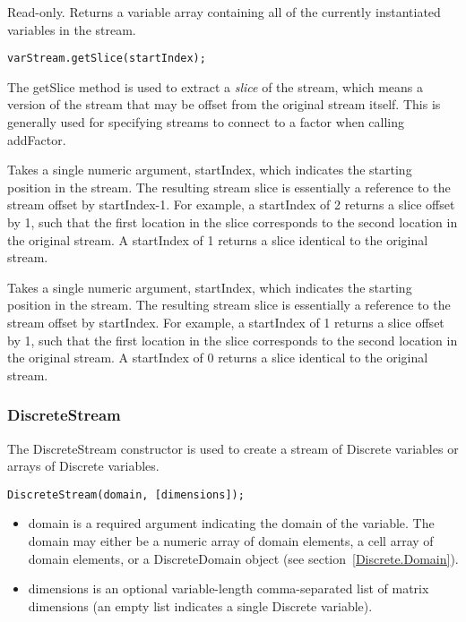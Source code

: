 
Read-only.  Returns a variable array containing all of the currently instantiated variables in the stream.



\label{sec:VariableStream.getSlice}

\begin{lstlisting}
varStream.getSlice(startIndex);
\end{lstlisting}

The getSlice method is used to extract a \emph{slice} of the stream, which means a version of the stream that may be offset from the original stream itself.  This is generally used for specifying streams to connect to a factor when calling addFactor.

\ifmatlab
Takes a single numeric argument, startIndex, which indicates the starting position in the stream.  The resulting stream slice is essentially a reference to the stream offset by startIndex-1.  For example, a startIndex of 2 returns a slice offset by 1, such that the first location in the slice corresponds to the second location in the original stream.  A startIndex of 1 returns a slice identical to the original stream.
\fi

\ifjava
Takes a single numeric argument, startIndex, which indicates the starting position in the stream.  The resulting stream slice is essentially a reference to the stream offset by startIndex.  For example, a startIndex of 1 returns a slice offset by 1, such that the first location in the slice corresponds to the second location in the original stream.  A startIndex of 0 returns a slice identical to the original stream.
\fi

\subsubsection{DiscreteStream}

\label{DiscreteStream.Constructor}

The DiscreteStream constructor is used to create a stream of Discrete variables or arrays of Discrete variables.

\ifmatlab
\begin{lstlisting}
DiscreteStream(domain, [dimensions]);
\end{lstlisting}

\begin{itemize}
\item domain is a required argument indicating the domain of the variable.  The domain may either be a numeric array of domain elements, a cell array of domain elements, or a DiscreteDomain object (see section~\ref{Discrete.Domain}).
\item dimensions is an optional variable-length comma-separated list of matrix dimensions (an empty list indicates a single Discrete variable).
\end{itemize}


